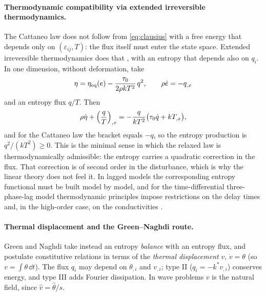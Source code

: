 \paragraph{Thermodynamic compatibility via extended irreversible thermodynamics.} The Cattaneo law does not follow from \eqref{eq:clausius} with a free energy that depends only on $(\varepsilon_{ij},T)$: the flux itself must enter the state space. Extended irreversible thermodynamics does that \citep{Jou2010,MuellerRuggeri1998,Mueller1967}, with an entropy that depends also on $q_i$. In one dimension, without deformation, take
\begin{equation}
\eta=\eta_{\rm eq}(e)-\frac{\tau_0}{2\rho kT^2}\,q^2,\qquad \rho\dot e=-q_{,x}
\end{equation}
and an entropy flux $q/T$. Then
\begin{equation}
\rho\dot\eta+\Bigl(\frac qT\Bigr)_{,x}=-\frac{q}{kT^2}\bigl(\tau_0\dot q+kT_{,x}\bigr),
\end{equation}
and for the Cattaneo law the bracket equals $-q$, so the entropy production is $q^2/(kT^2)\ge0$. This is the minimal sense in which the relaxed law is thermodynamically admissible: the entropy carries a quadratic correction in the flux. That correction is of second order in the disturbance, which is why the linear theory does not feel it. In lagged models the corresponding entropy functional must be built model by model, and for the time-differential three-phase-lag model thermodynamic principles impose restrictions on the delay times and, in the high-order case, on the conductivities \citep{Chirita2016,Chirita2017}.

\paragraph{Thermal displacement and the Green--Naghdi route.} Green and Naghdi \citep{Green1991,Green1993} take instead an entropy \emph{balance} with an entropy flux, and postulate constitutive relations in terms of the \emph{thermal displacement} $v$, $\dot v=\theta$ (so $v=\int\theta\,\dd t$). The flux $q_i$ may depend on $\theta_{,i}$ and $v_{,i}$; type II ($q_i=-k^*v_{,i}$) conserves energy, and type III adds Fourier dissipation. In wave problems $v$ is the natural field, since $\hat v=\hat\theta/s$.

